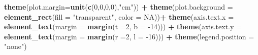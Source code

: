 \documentclass[12pt,oneside]{reedthesis}
\newenvironment{Shaded}{\begin{snugshade}}{\end{snugshade}}
\newcommand{\DataTypeTok}[1]{\textcolor[rgb]{0.13,0.29,0.53}{#1}}
\newcommand{\DecValTok}[1]{\textcolor[rgb]{0.00,0.00,0.81}{#1}}
\newcommand{\KeywordTok}[1]{\textcolor[rgb]{0.13,0.29,0.53}{\textbf{#1}}}
\newcommand{\NormalTok}[1]{#1}
\newcommand{\OperatorTok}[1]{\textcolor[rgb]{0.81,0.36,0.00}{\textbf{#1}}}
\newcommand{\OtherTok}[1]{\textcolor[rgb]{0.56,0.35,0.01}{#1}}
\newcommand{\StringTok}[1]{\textcolor[rgb]{0.31,0.60,0.02}{#1}}
\begin{document}
\begin{Shaded}
\begin{Highlighting}[]
\StringTok{  }\KeywordTok{theme}\NormalTok{(}\DataTypeTok{plot.margin=}\KeywordTok{unit}\NormalTok{(}\KeywordTok{c}\NormalTok{(}\DecValTok{0}\NormalTok{,}\DecValTok{0}\NormalTok{,}\DecValTok{0}\NormalTok{,}\DecValTok{0}\NormalTok{),}\StringTok{"cm"}\NormalTok{)) }\OperatorTok{+}
\StringTok{  }\KeywordTok{theme}\NormalTok{(}\DataTypeTok{plot.background =} \KeywordTok{element_rect}\NormalTok{(}\DataTypeTok{fill =} \StringTok{"transparent"}\NormalTok{, }\DataTypeTok{color =} \OtherTok{NA}\NormalTok{))}\OperatorTok{+}
\StringTok{  }\KeywordTok{theme}\NormalTok{(}\DataTypeTok{axis.text.x =} \KeywordTok{element_text}\NormalTok{(}\DataTypeTok{margin =}  \KeywordTok{margin}\NormalTok{(}\DataTypeTok{t =}\DecValTok{2}\NormalTok{, }\DataTypeTok{b =} \DecValTok{-14}\NormalTok{))) }\OperatorTok{+}\StringTok{ }
\StringTok{  }\KeywordTok{theme}\NormalTok{(}\DataTypeTok{axis.text.y =} \KeywordTok{element_text}\NormalTok{(}\DataTypeTok{margin =}  \KeywordTok{margin}\NormalTok{(}\DataTypeTok{r =}\DecValTok{2}\NormalTok{, }\DataTypeTok{l =} \DecValTok{-16}\NormalTok{))) }\OperatorTok{+}
\StringTok{  }\KeywordTok{theme}\NormalTok{(}\DataTypeTok{legend.position =} \StringTok{"none"}\NormalTok{)}


\end{Highlighting}
\end{Shaded}
\end{document}
